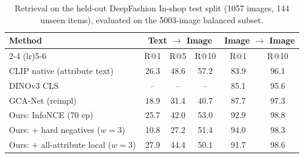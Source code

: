 \begin{table}[t]
\centering
\caption{Retrieval on the held-out DeepFashion In-shop test split (1057 images, 144 unseen items), evaluated on the 5003-image balanced subset.}
\label{tab:main}
\begin{tabular}{lccc cc}
\toprule
Method & \multicolumn{3}{c}{Text $\to$ Image} & \multicolumn{2}{c}{Image $\to$ Image} \\
\cmidrule(lr){2-4} \cmidrule(lr){5-6}
 & R@1 & R@5 & R@10 & R@1 & R@10 \\
\midrule
CLIP native (attribute text) & 26.3 & 48.6 & 57.2 & 83.9 & 96.1 \\
DINOv3 CLS & -- & -- & -- & 85.1 & 95.6 \\
GCA-Net (reimpl) & 18.9 & 31.4 & 40.7 & 87.7 & 97.3 \\
Ours: InfoNCE (70 ep) & 25.7 & 42.0 & 53.0 & 92.9 & 98.8 \\
Ours: + hard negatives ($w{=}3$) & 10.8 & 27.2 & 51.4 & 94.0 & 98.3 \\
Ours: + all-attribute local ($w{=}3$) & 27.9 & 44.4 & 50.1 & 91.7 & 98.6 \\
\bottomrule
\end{tabular}
\end{table}
